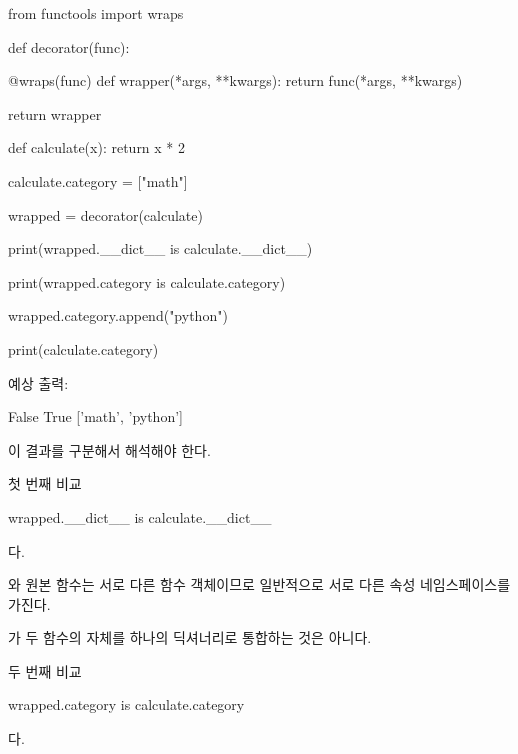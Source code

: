 \begin{dhkcode}
from functools import wraps

def decorator(func):

    @wraps(func)
    def wrapper(*args, **kwargs):
        return func(*args, **kwargs)

    return wrapper


def calculate(x):
    return x * 2


calculate.category = ["math"]

wrapped = decorator(calculate)

print(wrapped.__dict__ is calculate.__dict__)

print(wrapped.category is calculate.category)

wrapped.category.append("python")

print(calculate.category)
\end{dhkcode}

예상 출력:

\begin{dhkzsh}
False
True
['math', 'python']
\end{dhkzsh}

이 결과를 구분해서 해석해야 한다.

\begin{dhknote}
\begin{dhksmry}[centered]
첫 번째 비교
\end{dhksmry}
\end{dhknote}

\begin{dhkcode}
wrapped.__dict__ is calculate.__dict__
\end{dhkcode}

다.

와 원본 함수는 서로 다른 함수 객체이므로 일반적으로 서로 다른 속성 네임스페이스를 가진다.

가 두 함수의  자체를 하나의 딕셔너리로 통합하는 것은 아니다.

\begin{dhknote}
\begin{dhksmry}[centered]
두 번째 비교
\end{dhksmry}
\end{dhknote}

\begin{dhkcode}
wrapped.category is calculate.category
\end{dhkcode}

다.

